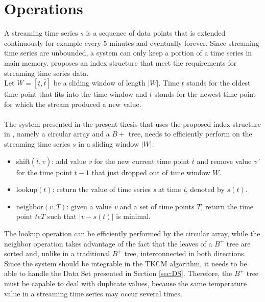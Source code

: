 \documentclass[abstracton,12pt]{scrreprt}
\begin{document}
\section{Operations}
\label{sec:Op}
A streaming time series $s$ is a sequence of data points that is extended continuously for example every 5 minutes and eventually forever. Since streaming time series are unbounded, a system can only keep a portion of a time series in main memory. \cite{BScT} proposes an index structure that meet the requirements for streaming time series data.\\
Let $W=[ \underline{t}, \bar{t} ]$ be a sliding window of length $|W|$. Time $\underline{t}$ stands for the oldest time point that fits into the time window and $\bar{t}$ stands for the newest time point for which the stream produced a new value. \\\\
The system presented in the present thesis that uses the proposed index structure in \cite{BScT}, namely a circular array and a $B+$ tree, needs to efficiently perform on the streaming time series $s$ in a sliding window $|W|$: \\
\begin{itemize}  
	\item shift$(\bar{t}, v)$: add value \emph{v} for the new current time point $\bar{t}$ and remove value \emph{v'} for the time point $\underline{t} - 1$ that just dropped out of time window $W$.
	\item lookup$(t)$: return the value of time series \emph{s} at time \emph{t}, denoted by $s(t)$.
	\item neighbor$(v, T)$: given a value \emph{v} and a set of time points $T$, return the time point $t e T$ such that $|v-s(t)|$ is minimal.\\
\end{itemize}
The lookup operation can be efficiently performed by the circular array, while the neighbor operation takes advantage of the fact that the leaves of a $B^+$ tree are sorted and, unlike in a traditional $B^+$ tree, interconnected in both directions. \\
Since the system should be integrable in the TKCM algorithm, it needs to be able to handle the Data Set presented in Section \ref{sec:DS}. Therefore, the $B^+$ tree must be capable to deal with duplicate values, because the same temperature value in a streaming time series may occur several times. 
\end{document}
